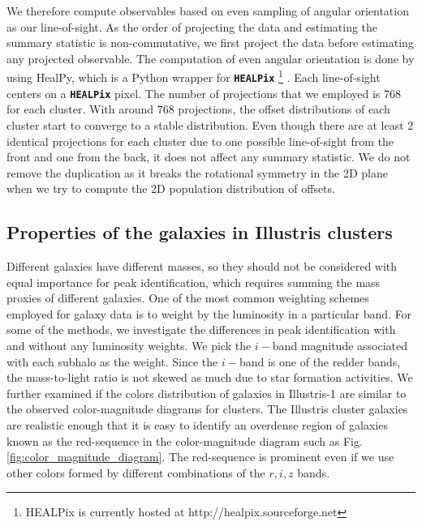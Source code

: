 We therefore compute observables based on even sampling of angular orientation 
as our line-of-sight.
As the order of projecting the data and estimating the summary statistic is
non-commutative, we first project the data before estimating any projected 
observable. 
The computation of even angular orientation 
is done by using HealPy, which is a Python wrapper for
{\bf \texttt{HEALPix}} \footnote{HEALPix is
currently hosted at http://healpix.sourceforge.net}
\citep{Gorski2005}. Each line-of-sight centers on a {\bf \texttt{HEALPix}} 
pixel.
The number of projections that we employed is 768 for each cluster. With around 
768 projections, the offset distributions of each cluster start to converge to a
stable distribution. 
Even though there are at least 2 identical projections for each cluster due to
one possible line-of-sight from the front and one from the back, it does not
affect any summary statistic. We do not remove the duplication as it breaks
the rotational symmetry in the 2D plane when we try to compute the 2D population
distribution of offsets.  


\subsection{Properties of the galaxies in Illustris clusters}
\label{subsec:galaxy_properties}

Different galaxies have different masses, so they should not be considered with equal
importance for peak identification, which requires summing
the mass proxies of different galaxies. One of the most common weighting schemes employed for galaxy data is to weight
by the luminosity in a particular band. For some of the methods, we investigate
the differences in peak identification with and without any luminosity weights.
We pick the $i-$band magnitude
associated with each subhalo as the weight. Since the $i-$band is
one of the redder bands, the mass-to-light ratio is not skewed as much due to star
formation activities. 
We further examined if the colors distribution of galaxies in Illustris-1 are
similar to the observed color-magnitude diagrams for clusters.
The Illustris cluster galaxies are realistic enough that it is easy to
identify an overdense region of galaxies known as the red-sequence in the 
color-magnitude diagram such as Fig.
\ref{fig:color_magnitude_diagram}. The red-sequence is prominent even if we
use other colors formed by different combinations of the $r, i, z$ bands.

